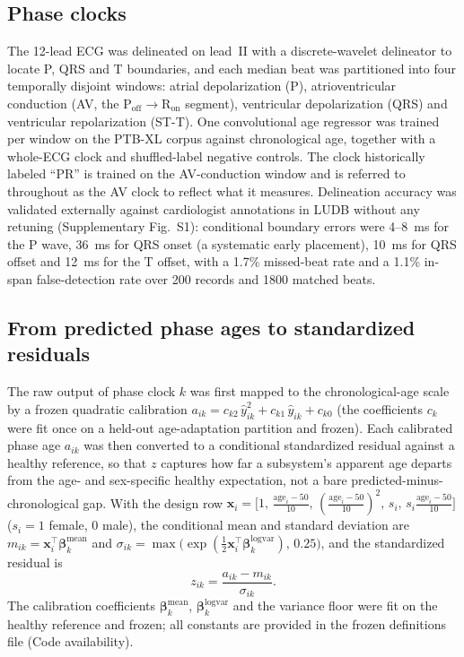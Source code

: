 \documentclass[11pt]{article}
\begin{document}
\subsection{Phase clocks}
The 12-lead ECG was delineated on lead~II with a discrete-wavelet delineator to locate
P, QRS and T boundaries, and each median beat was partitioned into four temporally
disjoint windows: atrial depolarization (P), atrioventricular conduction (AV, the
$\text{P}_{\text{off}}\!\to\!\text{R}_{\text{on}}$ segment), ventricular depolarization
(QRS) and ventricular repolarization (ST-T). One convolutional age regressor was trained
per window on the PTB-XL corpus against chronological age, together with a whole-ECG
clock and shuffled-label negative controls. The clock historically labeled ``PR'' is
trained on the AV-conduction window and is referred to throughout as the AV clock to
reflect what it measures. Delineation accuracy was validated externally against
cardiologist annotations in LUDB without any retuning (Supplementary Fig.~S1):
conditional boundary errors were \num{4}--\SI{8}{\milli\second} for the P wave,
\SI{36}{\milli\second} for QRS onset (a systematic early placement), \SI{10}{\milli\second}
for QRS offset and \SI{12}{\milli\second} for the T offset, with a \num{1.7}\% missed-beat
rate and a \num{1.1}\% in-span false-detection rate over \num{200} records and \num{1800}
matched beats.

\subsection{From predicted phase ages to standardized residuals}
\label{sec:zscore}
The raw output of phase clock $k$ was first mapped to the chronological-age scale by a
frozen quadratic calibration $a_{ik}=c_{k2}\,\hat y_{ik}^{2}+c_{k1}\,\hat y_{ik}+c_{k0}$
(the coefficients $c_k$ were fit once on a held-out age-adaptation partition and frozen).
Each calibrated phase age $a_{ik}$ was then converted to a conditional standardized
residual against a healthy reference, so that $z$ captures how far a subsystem's apparent
age departs from the age- and sex-specific healthy expectation, not a bare
predicted-minus-chronological gap. With the design row
$\mathbf{x}_i=\bigl[1,\,\tfrac{\text{age}_i-50}{10},\,(\tfrac{\text{age}_i-50}{10})^2,\,s_i,\,s_i\tfrac{\text{age}_i-50}{10}\bigr]$
($s_i=1$ female, $0$ male), the conditional mean and standard deviation are
$m_{ik}=\mathbf{x}_i^{\top}\boldsymbol\beta^{\text{mean}}_k$ and
$\sigma_{ik}=\max\!\bigl(\exp(\tfrac12\mathbf{x}_i^{\top}\boldsymbol\beta^{\text{logvar}}_k),\,0.25\bigr)$,
and the standardized residual is
\begin{equation}
z_{ik}=\frac{a_{ik}-m_{ik}}{\sigma_{ik}}.
\end{equation}
The calibration coefficients $\boldsymbol\beta^{\text{mean}}_k$,
$\boldsymbol\beta^{\text{logvar}}_k$ and the variance floor were fit on the healthy
reference and frozen; all constants are provided in the frozen definitions file (Code
availability).
\end{document}
